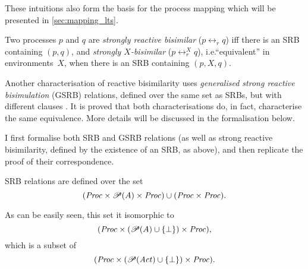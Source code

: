 \begin{isabellebody}
\begin{isamarkuptext}
These intuitions also form the basis for the process mapping which will be presented in \cref{sec:mapping_lts}.%
\end{isamarkuptext}\isamarkuptrue%
%
\isadelimdocument
%
\endisadelimdocument
%
\isatagdocument
%
\isamarkuptrue%
%
\endisatagdocument
{\isafolddocument}%
%
\isadelimdocument
%
\endisadelimdocument
%
\begin{isamarkuptext}%
Two processes $p$ and $q$ are \emph{strongly reactive bisimilar} ($p \leftrightarrow_r q$) iff there is an SRB containing $(p,q)$, and \emph{strongly $X$-bisimilar} ($p \leftrightarrow_r^X q$), i.e.\@ \enquote{equivalent} in environments~$X$, when there is an SRB containing $(p,X,q)$.%
\end{isamarkuptext}\isamarkuptrue%
%
\isadelimdocument
%
\endisadelimdocument
%
\isatagdocument
%
\isamarkuptrue%
%
\endisatagdocument
{\isafolddocument}%
%
\isadelimdocument
%
\endisadelimdocument
%
\begin{isamarkuptext}%
Another characterisation of reactive bisimilarity uses \emph{generalised strong reactive bisimulation} (GSRB) relations, defined over the same set as SRBs, but with different clauses \cite[Definition 3]{rbs}. It is proved that both characterisations do, in fact, characterise the same equivalence. More details will be discussed in the formalisation below.%
\end{isamarkuptext}\isamarkuptrue%
%
\isadelimdocument
%
\endisadelimdocument
%
\isatagdocument
%
\isamarkuptrue%
%
\endisatagdocument
{\isafolddocument}%
%
\isadelimdocument
%
\endisadelimdocument
%
\begin{isamarkuptext}%
I first formalise both SRB and GSRB relations (as well as strong reactive bisimilarity, defined by the existence of an SRB, as above), and then replicate the proof of their correspondence.%
\end{isamarkuptext}\isamarkuptrue%
%
\isadelimdocument
%
\endisadelimdocument
%
\isatagdocument
%
\isamarkuptrue%
%
\endisatagdocument
{\isafolddocument}%
%
\isadelimdocument
%
\endisadelimdocument
%
\begin{isamarkuptext}%
SRB relations are defined over the set
$$(\mathit{Proc} \times \mathscr{P}(A) \times \mathit{Proc}) \cup (\mathit{Proc} \times \mathit{Proc}).$$

As can be easily seen, this set it isomorphic to
$$(\mathit{Proc} \times (\mathscr{P}(A) \cup \{\bot\}) \times \mathit{Proc}),$$
which is a subset of
$$(\mathit{Proc} \times (\mathscr{P}(\mathit{Act}) \cup \{\bot\}) \times \mathit{Proc}).$$ 


\end{isamarkuptext}
\end{isabellebody}
